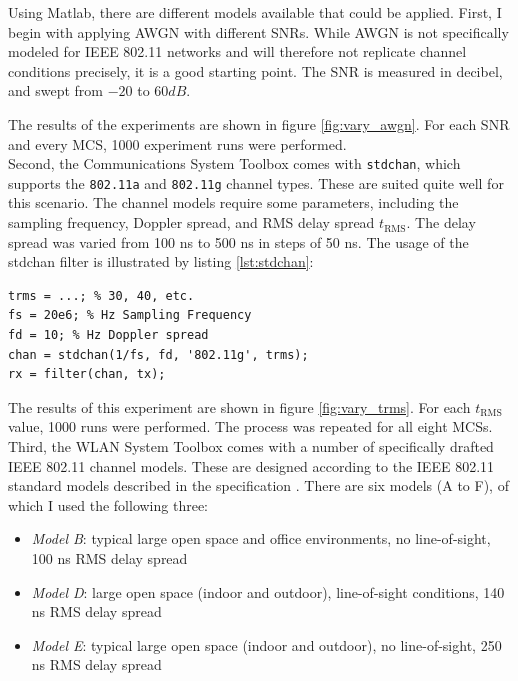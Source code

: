 Using Matlab, there are different models available that could be applied. First, I begin with applying \gls{AWGN} with different \glspl{SNR}. While \gls{AWGN} is not specifically modeled for IEEE 802.11 networks and will therefore not replicate channel conditions precisely, it is a good starting point. The \gls{SNR} is measured in decibel, and swept from $ -20 $ to $ 60 dB $.

The results of the experiments are shown in figure \ref{fig:vary_awgn}. For each \gls{SNR} and every \gls{MCS}, 1000 experiment runs were performed.\\

Second, the Communications System Toolbox comes with \texttt{stdchan}, which supports the \texttt{802.11a} and \texttt{802.11g} channel types. These are suited quite well for this scenario. The channel models require some parameters, including the sampling frequency, Doppler spread, and \gls{RMS} delay spread $ t_{\text{RMS}} $. The delay spread was varied from 100 ns to 500 ns in steps of 50 ns. The usage of the stdchan filter is illustrated by listing \ref{lst:stdchan}:

\begin{lstlisting}[captionpos=b,caption={Matlab stdchan Channel Model},label=lst:stdchan]
trms = ...; % 30, 40, etc.
fs = 20e6; % Hz Sampling Frequency
fd = 10; % Hz Doppler spread
chan = stdchan(1/fs, fd, '802.11g', trms);
rx = filter(chan, tx);
\end{lstlisting}

The results of this experiment are shown in figure \ref{fig:vary_trms}. For each $ t_{\text{RMS}} $ value, 1000 runs were performed. The process was repeated for all eight \glspl{MCS}.\\

Third, the WLAN System Toolbox comes with a number of specifically drafted IEEE 802.11 channel models. These are designed according to the IEEE 802.11 standard models described in the specification \cite{ieee2012}. There are six models (A to F), of which I used the following three:

\begin{itemize}
	\item \textit{Model B}: typical large open space and office environments, no line-of-sight, 100 ns \gls{RMS} delay spread
	\item \textit{Model D}: large open space (indoor and outdoor), line-of-sight conditions, 140 ns \gls{RMS} delay spread
	\item \textit{Model E}: typical large open space (indoor and outdoor), no line-of-sight, 250 ns \gls{RMS} delay spread
\end{itemize}

